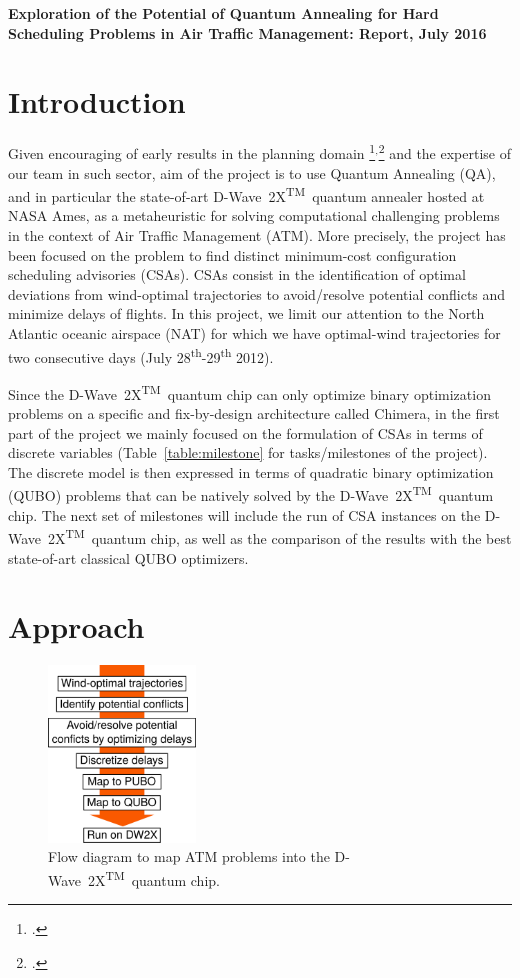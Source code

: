 \documentclass[10pt]{extarticle}
\renewcommand{\tablename}{Table}
\newcommand{\DW}{\mbox{D-Wave 2X\textsuperscript{TM}}~}
\begin{document}
\begin{center}\Large
\textbf{Exploration of the Potential of Quantum Annealing for Hard Scheduling
Problems in Air Traffic Management: Report, July 2016}
\end{center}

\section*{Introduction}\label{sec:intro}

Given encouraging of early results in the planning domain \footcite{rieffel:15}$^,$\footcite{venturelli:15}
and the expertise of our team in such sector, 
aim of the project is to use Quantum Annealing (QA), and in particular the state-of-art \DW quantum annealer hosted at NASA Ames, 
as a metaheuristic for solving computational challenging problems in the context of
Air Traffic Management (ATM). More precisely, the project has been focused on the problem to find distinct minimum-cost configuration scheduling advisories (CSAs).
CSAs consist in the identification of optimal deviations from wind-optimal trajectories to avoid/resolve potential conflicts and minimize
delays of flights. In this project, we limit our attention to the North Atlantic oceanic airspace (NAT) for which we have optimal-wind trajectories
for two consecutive days (July 28\textsuperscript{th}-29\textsuperscript{th} 2012).

Since the \DW quantum chip can only optimize binary optimization problems on a specific and fix-by-design architecture called Chimera,
in the first part of the project we mainly focused on the formulation of CSAs in terms of discrete variables (\tablename~\ref{table:milestone} for tasks/milestones
of the project). The discrete model is then expressed in terms of quadratic binary optimization (QUBO) problems that can be natively solved by 
the \DW quantum chip. The next set of milestones will include the run of CSA instances on the \DW quantum chip, as well as the comparison of the results
with the best state-of-art classical QUBO optimizers.

\section*{Approach}\label{sec:approach}

\begin{figure}
\centering
\includegraphics[width=0.35\textwidth]{scheme}
\caption{\label{fig:scheme}Flow diagram to map ATM problems into the \DW quantum chip.}
\end{figure}
\end{document}
